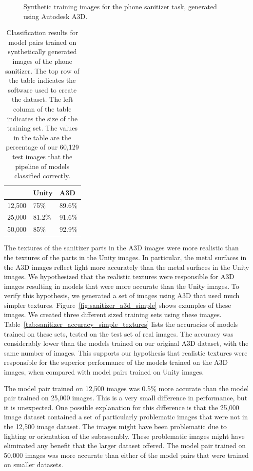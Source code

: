 \begin{figure}
  \caption{
    Synthetic training images for the phone sanitizer task, generated using
    Autodesk A3D.
  }\label{fig:sanitizer_a3d}
\end{figure}

\begin{table}
\begin{tabular}{|l||l|l|}
  \hline
  & Unity & A3D\\
  \hline
  \hline
  12,500 & 75\% & 89.6\% \\
  \hline
  25,000 & 81.2\% & 91.6\%\\
  \hline
  50,000 & 85\% & 92.9\%\\
  \hline
\end{tabular}
  \caption{
    Classification results for model pairs trained on synthetically generated
    images of the phone sanitizer.
    The top row of the table indicates the software used to create the dataset.
    The left column of the table indicates the size of the training set.
    The values in the table are the percentage of our 60,129 test images that
    the pipeline of models classified correctly.
  }\label{tab:sanitizer_accuracy}
\end{table}

The textures of the sanitizer parts in the A3D images were more realistic than
the textures of the parts in the Unity images.
In particular, the metal surfaces in the A3D images reflect light more
accurately than the metal surfaces in the Unity images.
We hypothesized that the realistic textures were responsible for A3D images
resulting in models that were more accurate than the Unity images.
To verify this hypothesis, we generated a set of images using A3D that used much
simpler textures.
Figure~\ref{fig:sanitizer_a3d_simple} shows examples of these images.
We created three different sized training sets using these images.
Table~\ref{tab:sanitizer_accuracy_simple_textures} lists the accuracies of
models trained on these sets, tested on the test set of real images.
The accuracy was considerably lower than the models trained on our original A3D
dataset, with the same number of images.
This supports our hypothesis that realistic textures were responsible for
the superior performance of the models trained on the A3D images, when
compared with model pairs trained on Unity images.

The model pair trained on 12,500 images was 0.5\% more accurate than the model
pair trained on 25,000 images.
This is a very small difference in performance, but it is unexpected.
One possible explanation for this difference is that the 25,000 image dataset
contained a set of particularly problematic images that were not in the 12,500
image dataset.
The images might have been problematic due to lighting or orientation of the
subassembly.
These problematic images might have eliminated any benefit that the larger
dataset offered.
The model pair trained on 50,000 images was more accurate than either of the
model pairs that were trained on smaller datasets.

